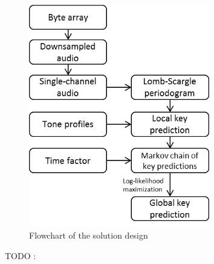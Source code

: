 \documentclass[letterpaper]{article}
\begin{document}
\begin{figure}[h!]
\begin{center}
\includegraphics[width=3.1in,angle=0]{imgs/flowChart.png}
\caption{Flowchart of the solution design}
\label{fig3}
\end{center}
\end{figure}

TODO : \citep{SK}


\footnotesize


\end{document}
